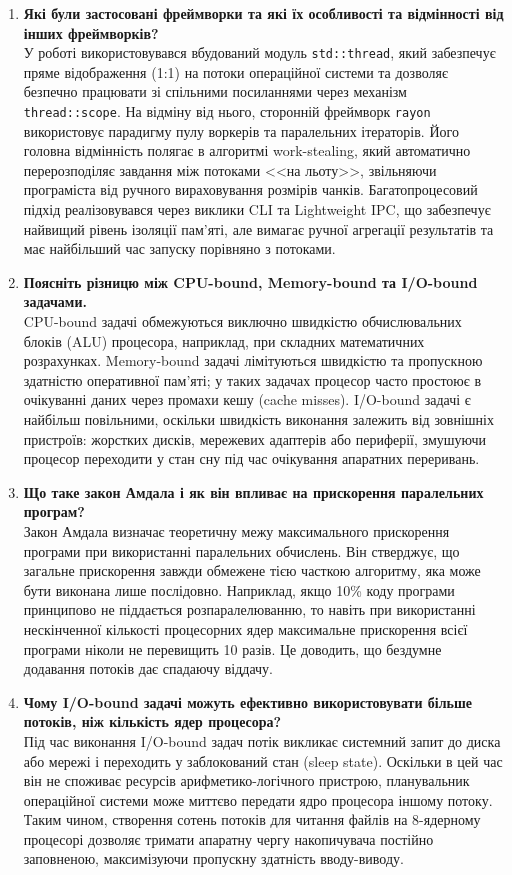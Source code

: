\documentclass[14pt, a4paper]{extreport}
\begin{document}
	\begin{enumerate}
		\item \textbf{Які були застосовані фреймворки та які їх особливості та відмінності від інших фреймворків?} \\ У роботі використовувався вбудований модуль \texttt{std::thread}, який забезпечує пряме відображення (1:1) на потоки операційної системи та дозволяє безпечно працювати зі спільними посиланнями через механізм \texttt{thread::scope}. На відміну від нього, сторонній фреймворк \texttt{rayon} використовує парадигму пулу воркерів та паралельних ітераторів. Його головна відмінність полягає в алгоритмі work-stealing, який автоматично перерозподіляє завдання між потоками <<на льоту>>, звільняючи програміста від ручного вираховування розмірів чанків. Багатопроцесовий підхід реалізовувався через виклики CLI та Lightweight IPC, що забезпечує найвищий рівень ізоляції пам'яті, але вимагає ручної агрегації результатів та має найбільший час запуску порівняно з потоками.
		
		\item \textbf{Поясніть різницю між CPU-bound, Memory-bound та I/O-bound задачами.} \\ CPU-bound задачі обмежуються виключно швидкістю обчислювальних блоків (ALU) процесора, наприклад, при складних математичних розрахунках. Memory-bound задачі лімітуються швидкістю та пропускною здатністю оперативної пам'яті; у таких задачах процесор часто простоює в очікуванні даних через промахи кешу (cache misses). I/O-bound задачі є найбільш повільними, оскільки швидкість виконання залежить від зовнішніх пристроїв: жорстких дисків, мережевих адаптерів або периферії, змушуючи процесор переходити у стан сну під час очікування апаратних переривань. 
		
		\item \textbf{Що таке закон Амдала і як він впливає на прискорення паралельних програм?} \\ Закон Амдала визначає теоретичну межу максимального прискорення програми при використанні паралельних обчислень. Він стверджує, що загальне прискорення завжди обмежене тією часткою алгоритму, яка може бути виконана лише послідовно. Наприклад, якщо 10\% коду програми принципово не піддається розпаралелюванню, то навіть при використанні нескінченної кількості процесорних ядер максимальне прискорення всієї програми ніколи не перевищить 10 разів. Це доводить, що бездумне додавання потоків дає спадаючу віддачу.
		
		\item \textbf{Чому I/O-bound задачі можуть ефективно використовувати більше потоків, ніж кількість ядер процесора?} \\ Під час виконання I/O-bound задач потік викликає системний запит до диска або мережі і переходить у заблокований стан (sleep state). Оскільки в цей час він не споживає ресурсів арифметико-логічного пристрою, планувальник операційної системи може миттєво передати ядро процесора іншому потоку. Таким чином, створення сотень потоків для читання файлів на 8-ядерному процесорі дозволяє тримати апаратну чергу накопичувача постійно заповненою, максимізуючи пропускну здатність вводу-виводу. 
		

\end{enumerate}
\end{document}
